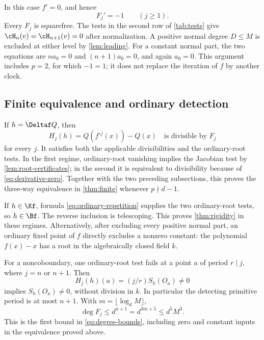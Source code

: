 In this case $f'=0$, and hence
\begin{equation}
 F_j'=-1\qquad(j\ge1).
 \label{eq:derivative-zero}
\end{equation}
Every $F_j$ is squarefree. The tests in the second row of
\cref{tab:tests} give $\cH_n(v)=\cH_{n+1}(v)=0$ after
normalization. A positive normal degree $D\le M$ is excluded
at either level by \cref{lem:leading}. For a constant normal
part, the two equations are $na_0=0$ and $(n+1)a_0=0$,
and again $a_0=0$. This argument includes $p=2$, for which
$-1=1$; it does not replace the iteration of $f$ by another clock.

\subsection{Finite equivalence and ordinary detection}

If $h=\Deltaf Q$, then
\begin{equation}
 H_j(h)=Q(f^{\circ j}(x))-Q(x)
\quad\text{is divisible by }F_j
 \label{eq:polynomial-telescoping}
\end{equation}
for every $j$. It satisfies both the applicable divisibilities
and the ordinary-root tests. In the first regime, ordinary-root
vanishing implies the Jacobian test by
\cref{lem:root-certificates}; in the second it is equivalent
to divisibility because of \eqref{eq:derivative-zero}.
Together with the two preceding subsections, this proves the
three-way equivalence in \cref{thm:finite} whenever $p\nmid d-1$.

If $h\in\Kf$, formula \eqref{eq:ordinary-repetition} supplies
the two ordinary-root tests, so $h\in\Bf$. The reverse inclusion
is telescoping. This proves \cref{thm:rigidity} in these regimes.
Alternatively, after excluding every positive normal part, an
ordinary fixed point of $f$ directly excludes a nonzero constant:
the polynomial $f(x)-x$ has a root in the algebraically closed
field $k$.

For a noncoboundary, one ordinary-root test fails at a point $a$
of period $r\mid j$, where $j=n$ or $n+1$. Then
\[
 H_j(h)(a)=(j/r)S_h(O_a)\ne0
\]
implies $S_h(O_a)\ne0$, without division in $k$. In particular
the detecting primitive period is at most $n+1$. With
$m=\lfloor\log_dM\rfloor$,
\[
 \deg F_j\le d^{n+1}=d^{3m+5}\le d^5M^3.
\]
This is the first bound in \eqref{eq:degree-bounds}, including
zero and constant inputs in the equivalence proved above.
